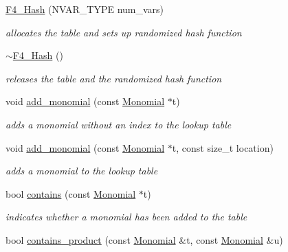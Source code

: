 \begin{DoxyCompactItemize}
\item 
\hyperlink{group___g_b_computation_a3983b59e08fa7ad90bba989850f9850f}{F4\+\_\+\+Hash} (N\+V\+A\+R\+\_\+\+T\+Y\+PE num\+\_\+vars)
\begin{DoxyCompactList}\small\item\em allocates the table and sets up randomized hash function \end{DoxyCompactList}\item 
\mbox{\label{group___g_b_computation_a25d18c80d34ca2b2113d0a49c92748a7}} 
\hyperlink{group___g_b_computation_a25d18c80d34ca2b2113d0a49c92748a7}{$\sim$\+F4\+\_\+\+Hash} ()
\begin{DoxyCompactList}\small\item\em releases the table and the randomized hash function \end{DoxyCompactList}\item 
void \hyperlink{group___g_b_computation_aaed2c308a7d79e098e6555d20b1720d0}{add\+\_\+monomial} (const \hyperlink{group__polygroup_class_monomial}{Monomial} $\ast$t)
\begin{DoxyCompactList}\small\item\em adds a monomial without an index to the lookup table \end{DoxyCompactList}\item 
void \hyperlink{group___g_b_computation_a86a18244162325e3d792ea39525b23f8}{add\+\_\+monomial} (const \hyperlink{group__polygroup_class_monomial}{Monomial} $\ast$t, const size\+\_\+t location)
\begin{DoxyCompactList}\small\item\em adds a monomial to the lookup table \end{DoxyCompactList}\item 
bool \hyperlink{group___g_b_computation_af4191f4fd7b43859efe6b30e4f702cb7}{contains} (const \hyperlink{group__polygroup_class_monomial}{Monomial} $\ast$t)
\begin{DoxyCompactList}\small\item\em indicates whether a monomial has been added to the table \end{DoxyCompactList}\item 
bool \hyperlink{group___g_b_computation_aae8b0444fbe19fff11a0a5d242295156}{contains\+\_\+product} (const \hyperlink{group__polygroup_class_monomial}{Monomial} \&t, const \hyperlink{group__polygroup_class_monomial}{Monomial} \&u)

\end{DoxyCompactItemize}
